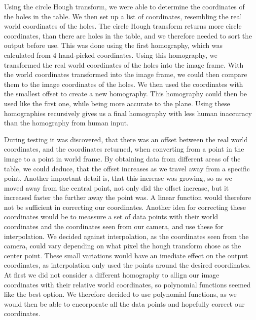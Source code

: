 Using the circle Hough transform, we were able to determine the coordinates of the holes in the table.
We then set up a list of coordinates, resembling the real world coordinates of the holes.
The circle Hough transform returns more circle coordinates, than there are holes in the table, and we therefore needed to sort the output before use.
This was done using the first homography, which was calculated from 4 hand-picked coordinates.
Using this homography, we transformed the real world coordinates of the holes into the image frame.
With the world coordinates transformed into the image frame, we could then compare them to the image coordinates of the holes.
We then used the coordinates with the smallest offset to create a new homography.
This homography could then be used like the first one, while being more accurate to the plane.
Using these homographies recursively gives us a final homography with less human inaccuracy than the homography from human input.

During testing it was discovered, that there was an offset between the real world coordinates, and the coordinates returned, when converting from a point in the image to a point in world frame. 
By obtaining data from different areas of the table, we could deduce, that the offset increases as we travel away from a specific point.
Another important detail is, that this increase was growing, so as we moved away from the central point, not only did the offset increase, but it increased faster the further away the point was.
A linear function would therefore not be sufficient in correcting our coordinates.
Another idea for correcting these coordinates would be to meassure a set of data points with their world coordinates and the coordinates seen from our camera, and use these for interpolation.
We decided against interpolation, as the coordinates seen from the camera, could vary depending on what pixel the hough transform chose as the center point.
These small variations would have an imediate effect on the output coordinates, as interpolation only used the points around the desired coordinates.
At first we did not consider a different homography to allign our image coordinates with their relative world coordinates, so polynomial functions seemed like the best option.
We therefore decided to use polynomial functions, as we would then be able to encorporate all the data points and hopefully correct our coordinates.

